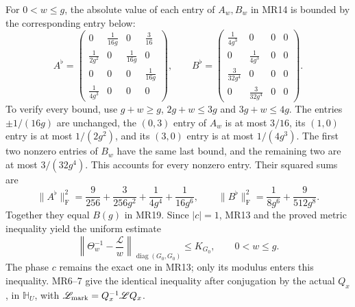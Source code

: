 \documentclass[11pt]{article}
\begin{document}
For $0<w\le g$, the absolute value of each entry of $A_w,B_w$
in MR14 is bounded by the corresponding entry below:
\begin{equation}
 A^\flat=
 \begin{pmatrix}
 0&\frac1{16g}&0&\frac3{16}\\
 \frac1{2g^2}&0&\frac1{16g}&0\\
 0&0&0&\frac1{16g}\\
 \frac1{4g^3}&0&0&0
 \end{pmatrix},\qquad
 B^\flat=
 \begin{pmatrix}
 \frac1{4g^3}&0&0&0\\
 0&\frac1{4g^3}&0&0\\
 \frac3{32g^4}&0&0&0\\
 0&\frac3{32g^4}&0&0
 \end{pmatrix}.
 \tag{MR20}
\end{equation}
To verify every bound, use $g+w\ge g$, $2g+w\le3g$ and
$3g+w\le4g$. The entries $\pm1/(16g)$ are unchanged,
the $(0,3)$ entry of $A_w$ is at most $3/16$, its $(1,0)$
entry is at most $1/(2g^2)$, and its $(3,0)$ entry is at most
$1/(4g^3)$. The first two nonzero entries of $B_w$ have
the same last bound, and the remaining two are at most
$3/(32g^4)$. This accounts for every nonzero entry.
Their squared sums are
\[
 \|A^\flat\|_{\mathrm F}^2
 =\frac9{256}+\frac3{256g^2}+\frac1{4g^4}+\frac1{16g^6},
 \qquad
 \|B^\flat\|_{\mathrm F}^2
 =\frac1{8g^6}+\frac9{512g^8}.
\]
Together they equal $B(g)$ in MR19. Since $|c|=1$, MR13
and the proved metric inequality yield the uniform estimate
\begin{equation}
 \left\|\Theta_w^{-1}-\frac{\mathscr L}{w}
       \right\|_{\operatorname{diag}(G_0,G_0)}
 \le K_{G_0},\qquad 0<w\le g.
 \tag{MR21}
\end{equation}
The phase $c$ remains the exact one in MR13; only its
modulus enters this inequality. MR6--7 give the identical
inequality after conjugation by the actual $Q_x$, in
$\mathbb H_U$, with
$\mathscr L_{\rm mark}=Q_x^{-1}\mathscr LQ_x$.
\end{document}
